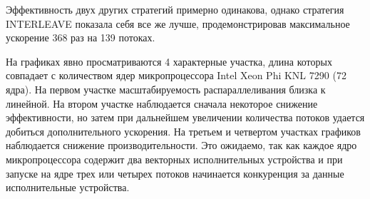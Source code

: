 Эффективность двух других стратегий примерно одинакова, однако стратегия INTERLEAVE показала себя все же лучше, продемонстрировав максимальное ускорение 368 раз на 139 потоках.

На графиках явно просматриваются 4 характерные участка, длина которых совпадает с количеством ядер микропроцессора Intel Xeon Phi KNL 7290 (72 ядра).
На первом участке масштабируемость распараллеливания близка к линейной. На втором участке наблюдается сначала некоторое снижение эффективности, но затем при дальнейшем увеличении количества потоков удается добиться дополнительного ускорения.
На третьем и четвертом участках графиков наблюдается снижение производительности.
Это ожидаемо, так как каждое ядро микропроцессора содержит два векторных исполнительных устройства и при запуске на ядре трех или четырех потоков начинается конкуренция за данные исполнительные устройства.
